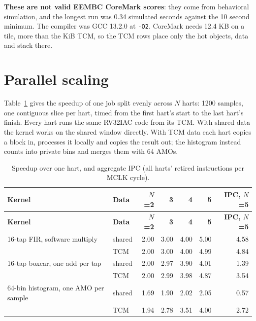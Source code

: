\documentclass[11pt,pdftex,openany,letterpaper]{report}
\begin{document}
\textbf{These are not valid EEMBC CoreMark scores}: they come from behavioral simulation, and the longest run was 0.34 simulated seconds against the 10 second minimum. The compiler was GCC 13.2.0 at \texttt{-O2}. CoreMark needs 12.4 KB on a tile, more than the \TcmSizeKiB{} KiB TCM, so the TCM rows place only the hot objects, data and stack there.

\section{Parallel scaling} \label{ss:cpi-parallel}

Table~\ref{t:cpi-parallel} gives the speedup of one job split evenly across $N$ harts: 1200 samples, one contiguous slice per hart, timed from the first hart's start to the last hart's finish. Every hart runs the same RV32IAC code from its TCM. With shared data the kernel works on the shared window directly. With TCM data each hart copies a block in, processes it locally and copies the result out; the histogram instead counts into private bins and merges them with 64 AMOs.

\begin{longtable}[c]{ l l r r r r r }
\caption{Speedup over one hart, and aggregate IPC (all harts' retired instructions per MCLK cycle).} \label{t:cpi-parallel} \\
\hline \textbf{Kernel} & \textbf{Data} & \textbf{$N$=2} & \textbf{3} & \textbf{4} & \textbf{5} & \textbf{IPC, $N$=5} \\ \hline \endfirsthead
\hline \textbf{Kernel} & \textbf{Data} & \textbf{$N$=2} & \textbf{3} & \textbf{4} & \textbf{5} & \textbf{IPC, $N$=5} \\ \hline \endhead
                               16-tap FIR, software multiply & shared & 2.00 & 3.00 & 4.00 & 5.00 & 4.58 \\
\rowcolor{tablehighlightcolor}                                 & TCM    & 2.00 & 3.00 & 4.00 & 4.99 & 4.84 \\
                               16-tap boxcar, one add per tap & shared & 2.00 & 2.97 & 3.90 & 4.01 & 1.39 \\
\rowcolor{tablehighlightcolor}                                 & TCM    & 2.00 & 2.99 & 3.98 & 4.87 & 3.54 \\
                               64-bin histogram, one AMO per sample & shared & 1.69 & 1.90 & 2.02 & 2.05 & 0.57 \\
\rowcolor{tablehighlightcolor}                                 & TCM    & 1.94 & 2.78 & 3.51 & 4.00 & 2.72 \\
\hline
\end{longtable}
\end{document}
